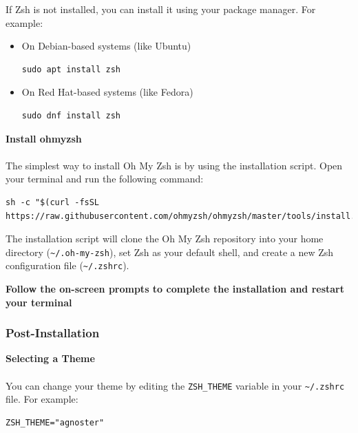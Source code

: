 \documentclass{article}
\newenvironment{codetemplate}[1][]{%
  \mybasecolorbox[#1]
  \itshape
}{%
  \endmybasecolorbox
}
\begin{document}
If Zsh is not installed, you can install it using your package manager. For example:
\begin{itemize}
    \item On Debian-based systems (like Ubuntu)
\begin{codetemplate}
\begin{verbatim}
sudo apt install zsh
\end{verbatim}
\end{codetemplate}
    \item On Red Hat-based systems (like Fedora)
\begin{codetemplate}
\begin{verbatim}
sudo dnf install zsh
\end{verbatim}
\end{codetemplate}
\end{itemize}

\textbf{Install ohmyzsh}
\\\\
The simplest way to install Oh My Zsh is by using the installation script. Open your terminal and run the following command:
\begin{codetemplate}
\begin{verbatim}
sh -c "$(curl -fsSL https://raw.githubusercontent.com/ohmyzsh/ohmyzsh/master/tools/install.sh)"
\end{verbatim}
\end{codetemplate}

The installation script will clone the Oh My Zsh repository into your home directory (\verb|~/.oh-my-zsh|), set Zsh as your default shell, and create a new Zsh configuration file (\verb|~/.zshrc|).

\textbf{Follow the on-screen prompts to complete the installation and restart your terminal}

\subsubsection{Post-Installation}

\textbf{Selecting a Theme}
\\\\
You can change your theme by editing the \verb|ZSH_THEME| variable in your \verb|~/.zshrc| file. For example:
\begin{codetemplate}
\begin{verbatim}
ZSH_THEME="agnoster"
\end{verbatim}
\end{codetemplate}
\end{document}
